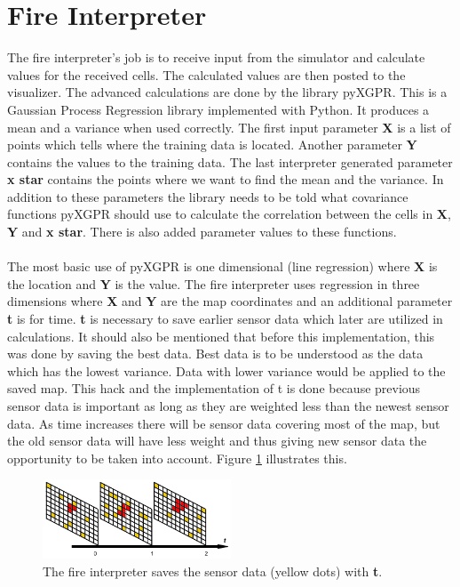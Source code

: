 \section{Fire Interpreter}
The fire interpreter's job is to receive input from the simulator and 
calculate values for the received cells. The calculated values are then posted to the visualizer. The advanced calculations are done by the library pyXGPR. This is a Gaussian Process Regression library implemented with Python. It produces a mean and a variance when used correctly. The first input parameter \textbf{X} is a list of points which tells where the training data is located. Another parameter \textbf{Y} contains the values to the training data. The last interpreter generated parameter \textbf{x star} contains the points where we want to find the mean and the variance. In addition to these parameters the library needs to be told what covariance functions pyXGPR should use to calculate the correlation between the cells in \textbf{X}, \textbf{Y} and \textbf{x star}. There is also added parameter values to these functions.
\\\\
The most basic use of pyXGPR is one dimensional (line regression) where \textbf{X} is the location and \textbf{Y} is the value. The fire interpreter uses regression in three dimensions where \textbf{X} and \textbf{Y} are the map coordinates and an additional parameter \textbf{t} is for time. \textbf{t} is necessary to save earlier sensor data which later are utilized in calculations. It should also be mentioned that before this implementation, this was done by saving the best data. Best data is to be understood as the data which has the lowest variance. Data with lower variance would be applied to the saved map. This hack and the implementation of t is done because previous sensor data is important as long as they are weighted less than the newest sensor data. As time increases there will be sensor data covering most of the map, but the old sensor data will have less weight and thus giving new sensor data the opportunity to be taken into account. Figure \ref{fig:timeElapse} illustrates this.
\begin{figure}[here]
  \centering
      \includegraphics[width=0.5\textwidth]{solution/graphics/timeElapse.png}
  \caption{The fire interpreter saves the sensor data (yellow dots) with \textbf{t}.}
  \label{fig:timeElapse}
\end{figure}
